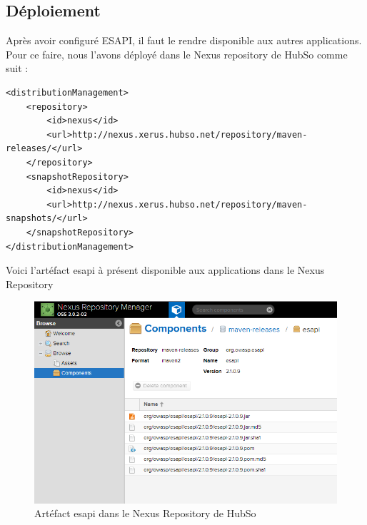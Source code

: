 \subsection{Déploiement}
Après avoir configuré ESAPI, il faut le rendre disponible aux autres applications. Pour ce faire, nous l'avons déployé dans le Nexus repository de HubSo comme suit :
\lstset{language=XML}
\begin{lstlisting}
<distributionManagement>
	<repository>
		<id>nexus</id>
		<url>http://nexus.xerus.hubso.net/repository/maven-releases/</url>
	</repository>
	<snapshotRepository>
		<id>nexus</id>
		<url>http://nexus.xerus.hubso.net/repository/maven-snapshots/</url>
	</snapshotRepository>
</distributionManagement>
\end{lstlisting}
Voici l'artéfact esapi à présent disponible aux applications dans le Nexus Repository
\begin{figure}[H]
	\centering
	\begin{minipage}{12cm}
		\centering
		\includegraphics[width=1\textwidth]{fig/nexus-esapi.png}
	\end{minipage}
	\caption{Artéfact esapi dans le Nexus Repository de HubSo}
	\label{fig:vccdf}
\end{figure}
